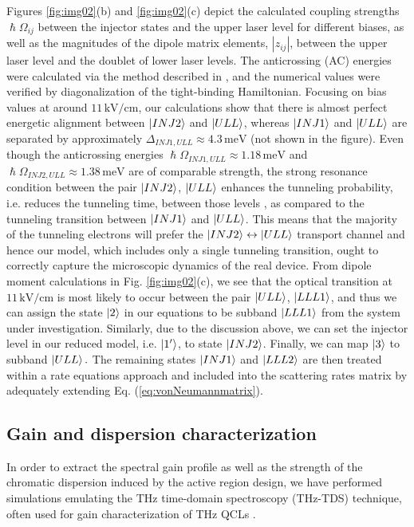 \documentclass[10pt]{article}
\begin{document}
	Figures \ref{fig:img02}(b) and \ref{fig:img02}(c) depict the calculated coupling
	strengths $\hslash\Omega_{ij}$ between the injector states and the upper laser
	level for different biases, as well as the magnitudes of the dipole matrix
	elements, $\left| z_{ij}\right|  $, between the upper laser level and the
	doublet of lower laser levels. The anticrossing (AC) energies were calculated via
	the method described in \cite{bastard1990wave}, and the numerical values were
	verified by diagonalization of the tight-binding Hamiltonian. Focusing on bias
	values at around $11{\,}\mathrm{kV}/\mathrm{cm}$, our calculations show that
	there is almost perfect energetic alignment between $\Ket{INJ2}\ $and
	$\Ket{ULL}$, whereas $\Ket{INJ1}$ and $\Ket{ULL}$ are separated by
	approximately $\Delta_{INJ1,ULL}\approx4.3{\,}\mathrm{meV}$ (not shown in the
	figure). Even though the anticrossing energies $\hslash\Omega_{INJ1,ULL}%
	\approx1.18{\,}\mathrm{meV}$ and $\hslash\Omega_{INJ2,ULL}\approx1.38{\,}%
	\mathrm{meV}$ are of comparable strength, the strong resonance condition
	between the pair $\Ket{INJ2}$, $\Ket{ULL}$ enhances the tunneling probability,
	i.e. reduces the tunneling time, between those levels
	\cite{williams2007terahertz}, as compared to the tunneling transition between
	$\Ket{INJ1}$ and $\Ket{ULL}$. This means that the majority of the tunneling
	electrons will prefer the $\Ket{INJ2}\leftrightarrow\Ket{ULL}$ transport
	channel and hence our model, which includes only a single tunneling
	transition, ought to correctly capture the microscopic dynamics of the real
	device. From dipole moment calculations in Fig. \ref{fig:img02}(c), we see that
	the optical transition at $11{\,}\mathrm{kV}/\mathrm{cm}$ is most likely to
	occur between the pair $\Ket{ULL}$, $\Ket{LLL1}$, and thus we can assign the
	state $\Ket{2}$ in our equations to be subband $\Ket{LLL1}$ from the system
	under investigation. Similarly, due to the discussion above, we can set the
	injector level in our reduced model, i.e. $\Ket{1'}$, to state $\Ket{INJ2}$.
	Finally, we can map $\Ket{3}$ to subband $\Ket{ULL}.$ The remaining states
	$\Ket{INJ1}$ and $\Ket{LLL2}$ are then treated within a rate equations
	approach and included into the scattering rates matrix by adequately extending
	Eq. (\ref{eq:vonNeumannmatrix}).
	
	\subsection{Gain and dispersion characterization}
	\label{subsec:numthztds} 
	In order to extract the spectral gain profile as well
	as the strength of the chromatic dispersion induced by the active region
	design, we have performed simulations emulating the THz time-domain
	spectroscopy (THz-TDS) technique, often used for gain characterization of THz
	QCLs \cite{burghoff2014broadband,jukam2008gain,martl2011gain}.
	
\end{document}
